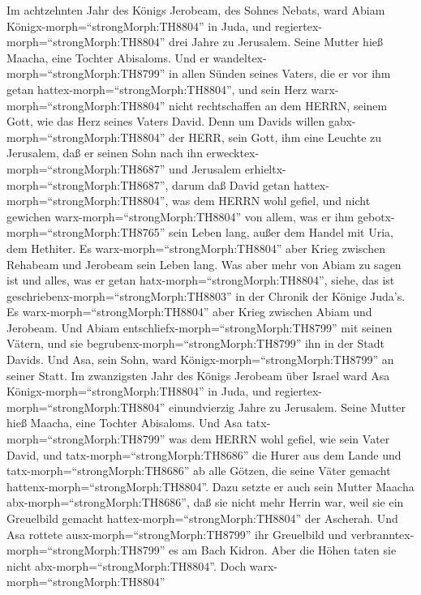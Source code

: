  Im achtzehnten Jahr des Königs Jerobeam, des Sohnes Nebats,
ward Abiam Königx-morph=``strongMorph:TH8804'' in Juda,  und
regiertex-morph=``strongMorph:TH8804'' drei Jahre zu Jerusalem. Seine
Mutter hieß Maacha, eine Tochter Abisaloms.  Und er
wandeltex-morph=``strongMorph:TH8799'' in allen Sünden seines Vaters,
die er vor ihm getan hattex-morph=``strongMorph:TH8804'', und sein Herz
warx-morph=``strongMorph:TH8804'' nicht rechtschaffen an dem HERRN,
seinem Gott, wie das Herz seines Vaters David.  Denn um
Davids willen gabx-morph=``strongMorph:TH8804'' der HERR, sein Gott, ihm
eine Leuchte zu Jerusalem, daß er seinen Sohn nach ihn
erwecktex-morph=``strongMorph:TH8687'' und Jerusalem
erhieltx-morph=``strongMorph:TH8687'',  darum daß David
getan hattex-morph=``strongMorph:TH8804'', was dem HERRN wohl gefiel,
und nicht gewichen warx-morph=``strongMorph:TH8804'' von allem, was er
ihm gebotx-morph=``strongMorph:TH8765'' sein Leben lang, außer dem
Handel mit Uria, dem Hethiter.  Es
warx-morph=``strongMorph:TH8804'' aber Krieg zwischen Rehabeam und
Jerobeam sein Leben lang.  Was aber mehr von Abiam zu sagen
ist und alles, was er getan hatx-morph=``strongMorph:TH8804'', siehe,
das ist geschriebenx-morph=``strongMorph:TH8803'' in der Chronik der
Könige Juda's. Es warx-morph=``strongMorph:TH8804'' aber Krieg zwischen
Abiam und Jerobeam.  Und Abiam
entschliefx-morph=``strongMorph:TH8799'' mit seinen Vätern, und sie
begrubenx-morph=``strongMorph:TH8799'' ihn in der Stadt Davids. Und Asa,
sein Sohn, ward Königx-morph=``strongMorph:TH8799'' an seiner Statt.
 Im zwanzigsten Jahr des Königs Jerobeam über Israel ward
Asa Königx-morph=``strongMorph:TH8804'' in Juda,  und
regiertex-morph=``strongMorph:TH8804'' einundvierzig Jahre zu Jerusalem.
Seine Mutter hieß Maacha, eine Tochter Abisaloms.  Und Asa
tatx-morph=``strongMorph:TH8799'' was dem HERRN wohl gefiel, wie sein
Vater David,  und tatx-morph=``strongMorph:TH8686'' die
Hurer aus dem Lande und tatx-morph=``strongMorph:TH8686'' ab alle
Götzen, die seine Väter gemacht hattenx-morph=``strongMorph:TH8804''.
 Dazu setzte er auch sein Mutter Maacha
abx-morph=``strongMorph:TH8686'', daß sie nicht mehr Herrin war, weil
sie ein Greuelbild gemacht hattex-morph=``strongMorph:TH8804'' der
Ascherah. Und Asa rottete ausx-morph=``strongMorph:TH8799'' ihr
Greuelbild und verbranntex-morph=``strongMorph:TH8799'' es am Bach
Kidron.  Aber die Höhen taten sie nicht
abx-morph=``strongMorph:TH8804''. Doch warx-morph=``strongMorph:TH8804''
